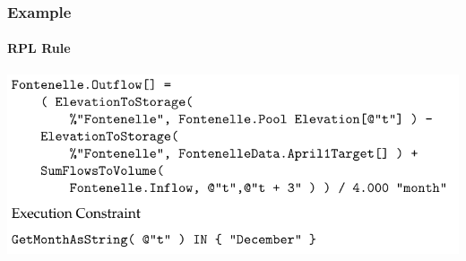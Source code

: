 \documentclass{beamer}
\begin{document}
\begin{frame}
\frametitle{Example}
\framesubtitle{RPL Rule}

\includegraphics[width=\textwidth]{figs/rpl.pdf}



 
 \end{frame}

\end{document}
